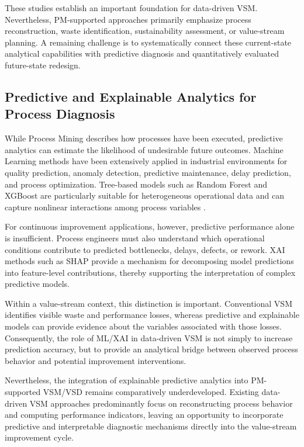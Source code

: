 \documentclass[pdflatex,iicol,Numbered,sn-basic]{sn-jnl}
\begin{document}
These studies establish an important foundation for data-driven VSM.
Nevertheless, PM-supported approaches primarily emphasize process
reconstruction, waste identification, sustainability assessment, or
value-stream planning. A remaining challenge is to systematically connect these
current-state analytical capabilities with predictive diagnosis and
quantitatively evaluated future-state redesign.

\subsection{Predictive and Explainable Analytics for Process Diagnosis}

While Process Mining describes how processes have been executed, predictive
analytics can estimate the likelihood of undesirable future outcomes. Machine
Learning methods have been extensively applied in industrial environments for
quality prediction, anomaly detection, predictive maintenance, delay
prediction, and process optimization. Tree-based models such as Random Forest
and XGBoost are particularly suitable for heterogeneous operational data and
can capture nonlinear interactions among process variables
\cite{Breiman2001,ChenGuestrin2016}.

For continuous improvement applications, however, predictive performance alone
is insufficient. Process engineers must also understand which operational
conditions contribute to predicted bottlenecks, delays, defects, or rework.
XAI methods such as SHAP provide a
mechanism for decomposing model predictions into feature-level contributions,
thereby supporting the interpretation of complex predictive models.

Within a value-stream context, this distinction is important. Conventional VSM
identifies visible waste and performance losses, whereas predictive and
explainable models can provide evidence about the variables associated with
those losses. Consequently, the role of ML/XAI in data-driven VSM is not simply
to increase prediction accuracy, but to provide an analytical bridge between
observed process behavior and potential improvement interventions.

Nevertheless, the integration of explainable predictive analytics into
PM-supported VSM/VSD remains comparatively underdeveloped. Existing
data-driven VSM approaches predominantly focus on reconstructing process
behavior and computing performance indicators, leaving an opportunity to
incorporate predictive and interpretable diagnostic mechanisms directly into
the value-stream improvement cycle.
\end{document}
